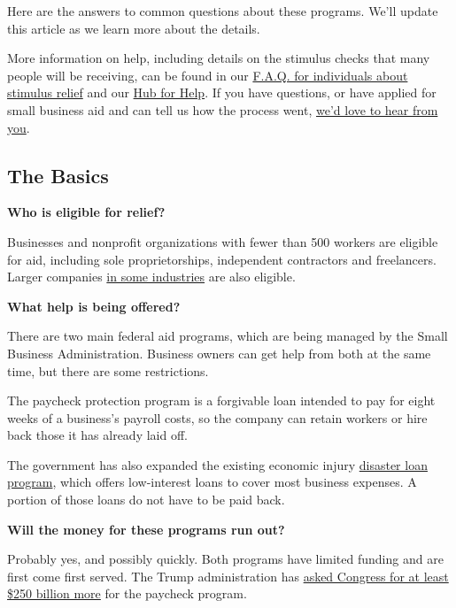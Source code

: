Here are the answers to common questions about these programs. We'll
update this article as we learn more about the details.

More information on help, including details on the stimulus checks that
many people will be receiving, can be found in our
\href{https://www.nytimes.com/article/coronavirus-stimulus-package-questions-answers.html}{F.A.Q.
for individuals about stimulus relief} and our
\href{https://www.nytimes.com/article/coronavirus-money-unemployment.html}{Hub
for Help}. If you have questions, or have applied for small business aid
and can tell us how the process went,
\href{mailto:stacy.cowley@nytimes.com}{we'd love to hear from you}.

\hypertarget{the-basics}{%
\subsection{The Basics}\label{the-basics}}

\textbf{Who is eligible for relief?}

Businesses and nonprofit organizations with fewer than 500 workers are
eligible for aid, including sole proprietorships, independent
contractors and freelancers. Larger companies
\href{https://www.sba.gov/document/support--table-size-standards}{in
some industries} are also eligible.

\textbf{What help is being offered?}

There are two main federal aid programs, which are being managed by the
Small Business Administration. Business owners can get help from both at
the same time, but there are some restrictions.

The paycheck protection program is a forgivable loan intended to pay for
eight weeks of a business's payroll costs, so the company can retain
workers or hire back those it has already laid off.

The government has also expanded the existing economic injury
\href{https://www.nytimes.com/2020/08/03/business/small-business-loans-coronavirus.html}{disaster
loan program}, which offers low-interest loans to cover most business
expenses. A portion of those loans do not have to be paid back.

\textbf{Will the money for these programs run out?}

Probably yes, and possibly quickly. Both programs have limited funding
and are first come first served. The Trump administration has
\href{https://www.nytimes.com/2020/04/09/us/politics/congress-coronavirus-small-businesses.html}{asked
Congress for at least \$250 billion more} for the paycheck program.

